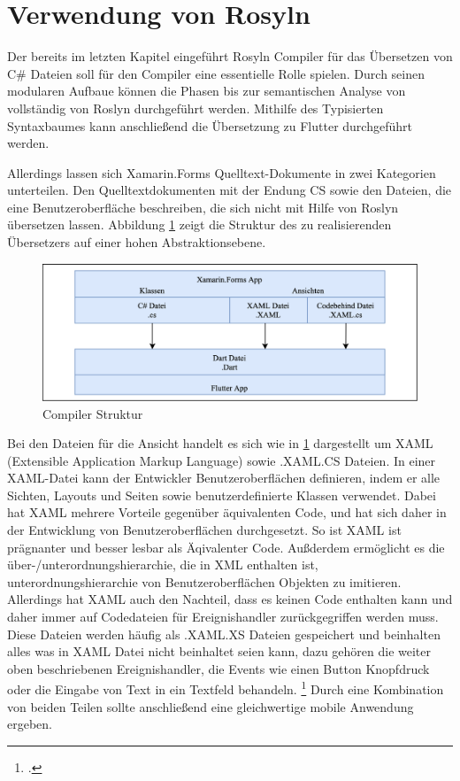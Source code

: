 \section{Verwendung von Rosyln}
Der bereits im letzten Kapitel eingeführt Rosyln Compiler für das Übersetzen von C\# Dateien soll für den Compiler eine essentielle Rolle spielen.  Durch seinen modularen Aufbaue können die Phasen bis zur semantischen Analyse von vollständig von Roslyn durchgeführt werden.  Mithilfe des Typisierten Syntaxbaumes kann anschließend die Übersetzung zu Flutter durchgeführt werden.  

Allerdings lassen sich Xamarin.Forms Quelltext-Dokumente in zwei Kategorien unterteilen.  Den Quelltextdokumenten mit der Endung CS sowie den Dateien,  die eine Benutzeroberfläche beschreiben,  die sich nicht mit Hilfe von Roslyn übersetzen lassen.  Abbildung \ref{fig:CompilerStruktur} zeigt die Struktur des zu realisierenden Übersetzers auf einer hohen Abstraktionsebene.
\begin{figure}[!ht]
 \includegraphics[width=14.5cm]{Images/Compiler/CompilerArchitecture.png}
 \caption{Compiler Struktur}
 \label{fig:CompilerStruktur}
\end{figure}


Bei den Dateien für die Ansicht handelt es sich wie in \ref{fig:CompilerStruktur} dargestellt um XAML (Extensible Application Markup Language) sowie .XAML.CS Dateien.  In einer XAML-Datei kann der Entwickler Benutzeroberflächen definieren, indem er alle Sichten, Layouts und Seiten sowie benutzerdefinierte Klassen verwendet.  Dabei hat XAML mehrere Vorteile gegenüber äquivalenten Code,  und hat sich daher in der Entwicklung von Benutzeroberflächen durchgesetzt.  So ist XAML ist prägnanter und besser lesbar als Äqivalenter Code.  Außderdem ermöglicht es die über-/unterordnungshierarchie, die in XML enthalten ist,  unterordnungshierarchie von Benutzeroberflächen Objekten zu imitieren.  Allerdings hat XAML auch den Nachteil, dass es keinen Code enthalten kann und daher immer auf Codedateien für Ereignishandler zurückgegriffen werden muss.  Diese Dateien werden häufig als .XAML.XS Dateien gespeichert und beinhalten alles was in XAML Datei nicht beinhaltet seien kann,  dazu gehören die weiter oben beschriebenen Ereignishandler,  die Events wie einen Button Knopfdruck oder die Eingabe von Text in ein Textfeld behandeln. \footcite[Vgl.][Abgerufen am \today]{MicrosoftXAML2017}
Durch eine Kombination von beiden Teilen sollte anschließend eine gleichwertige mobile Anwendung ergeben. 

